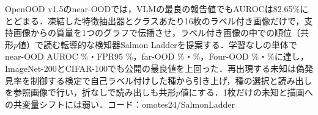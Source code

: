 OpenOOD v1.5のnear-OODでは，VLMの最良の報告値でもAUROCは82.65\%にとどまる．凍結した特徴抽出器とクラスあたり16枚のラベル付き画像だけで，支持画像からの質量を1つのグラフで伝播させ，ラベル付き画像の中での順位（共形$p$値）で読む転導的な検知器Salmon Ladderを提案する．学習なしの単体でnear-OOD AUROC \NRAloneNearAuroc\%・FPR95 \NRAloneNearFpr\%，far-OOD \NRAloneFarAuroc\%・\NRAloneFarFpr\%，Four-OOD \NRAloneFourAuroc\%・\NRAloneFourFpr\%に達し，ImageNet-200とCIFAR-100でも公開の最良値を上回った．再出現する未知は偽発見率を制御する検定で自己ラベル付けした種から引き上げ，種の選択と読み出しを参照画像で行い，折なしで読み出しも共形$p$値にする．1枚だけの未知と描画への共変量シフトには弱い．コード：omotes24/SalmonLadder
